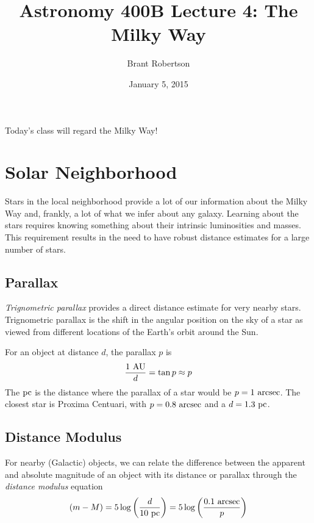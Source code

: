 \documentclass[]{article}
\title{Astronomy 400B Lecture 4: The Milky Way}
\author{Brant Robertson}
\date{January 5, 2015}
\begin{document}
\maketitle

Today's class will regard the Milky Way!

\section{Solar Neighborhood}

Stars in the local neighborhood provide a lot
of our information about the Milky Way and,
frankly, a lot of what we infer about any galaxy.
Learning about the stars requires knowing
something about their intrinsic luminosities
and masses. This requirement results in the
need to have robust distance estimates for
a large number of stars.

\subsection{Parallax}

{\it Trignometric parallax} provides a direct distance
estimate for very nearby stars.  Trignometric
parallax is the shift in the angular position on
the sky of a star as viewed from different
locations of the Earth's orbit around the Sun.

For an object at distance $d$, the parallax $p$
is
\begin{equation}
\frac{1~\mathrm{AU}}{d} = \tan p \approx p
\end{equation}
\noindent
The $\mathrm{pc}$ is the distance where the parallax
of a star would be $p=1~\mathrm{arcsec}$. The closest
star is Proxima Centuari, with $p=0.8~\mathrm{arcsec}$
and a $d=1.3~\mathrm{pc}$.

\subsection{Distance Modulus}

For nearby (Galactic) objects, we can relate the
difference between the apparent and absolute
magnitude of an object with its distance or
parallax through the {\it distance modulus}
equation
\begin{equation}
(m-M) = 5 \log \left(\frac{d}{10~\mathrm{pc}}\right) = 5 \log \left(\frac{0.1~\mathrm{arcsec}}{p}\right)
\end{equation}
\end{document}
